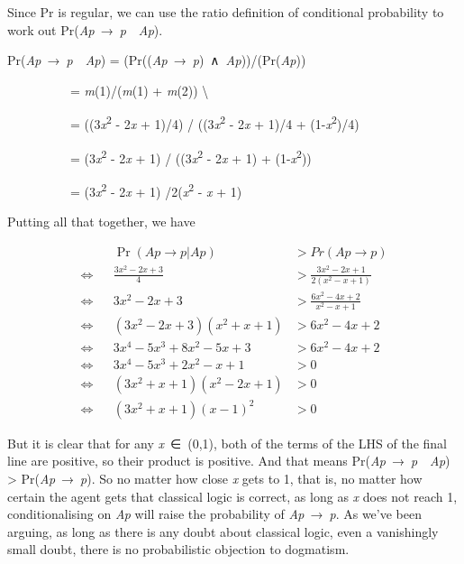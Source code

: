 \documentclass[
  11pt,
  letterpaper,
  DIV=11,
  numbers=noendperiod,
  twoside]{scrartcl}
\begin{document}
Since Pr is regular, we can use the ratio definition of conditional
probability to work out Pr(\emph{Ap}~→~\emph{p}~\textbar~\emph{Ap}).

Pr(\emph{Ap}~→~\emph{p}~\textbar~\emph{Ap}) =
(Pr((\emph{Ap}~→~\emph{p})~∧~\emph{Ap}))/(Pr(\emph{Ap}))\\
\strut ~~~~~~~~~~= \emph{m}(1)/(\emph{m}(1) + \emph{m}(2))
\textbackslash{}\\
\strut ~~~~~~~~~~= ((3\emph{x}\textsuperscript{2} - 2\emph{x} + 1)/4) /
((3\emph{x}\textsuperscript{2} - 2\emph{x} + 1)/4 +
(1-\emph{x}\textsuperscript{2})/4)\\
\strut ~~~~~~~~~~= (3\emph{x}\textsuperscript{2} - 2\emph{x} + 1) /
((3\emph{x}\textsuperscript{2} - 2\emph{x} + 1) +
(1-\emph{x}\textsuperscript{2}))\\
\strut ~~~~~~~~~~= (3\emph{x}\textsuperscript{2} - 2\emph{x} + 1)
/2(\emph{x}\textsuperscript{2} - \emph{x} + 1)

Putting all that together, we have

\[
\begin{aligned}
&& \Pr(Ap \rightarrow p | Ap) &> Pr(Ap \rightarrow p) \\
\Leftrightarrow &&  \frac{3x^2 - 2x + 3}{4}  &> \frac{3x^2 - 2x + 1}{2(x^2 - x + 1)} \\
\Leftrightarrow && 3x^2 - 2x + 3  &> \frac{6x^2 - 4x + 2}{x^2 - x + 1} \\
\Leftrightarrow && (3x^2 - 2x + 3)(x^2 + x + 1)  &> 6x^2 - 4x + 2 \\
\Leftrightarrow && 3x^4 - 5x^3 + 8x^2 - 5x + 3  &> 6x^2 - 4x + 2 \\
\Leftrightarrow && 3x^4 - 5x^3 + 2x^2 - x + 1 &> 0 \\
\Leftrightarrow && (3x^2 + x + 1)(x^2 - 2x + 1) &> 0 \\
\Leftrightarrow && (3x^2 + x + 1)(x - 1)^2 &> 0
\end{aligned}
\]

But it is clear that for any \emph{x}~∈~(0,1), both of the terms of the
LHS of the final line are positive, so their product is positive. And
that means Pr(\emph{Ap}~→~\emph{p}~\textbar~\emph{Ap}) \textgreater{}
Pr(\emph{Ap}~→~\emph{p}). So no matter how close \emph{x} gets to 1,
that is, no matter how certain the agent gets that classical logic is
correct, as long as \emph{x} does not reach 1, conditionalising on
\emph{Ap} will raise the probability of \emph{Ap}~→~\emph{p}. As we've
been arguing, as long as there is any doubt about classical logic, even
a vanishingly small doubt, there is no probabilistic objection to
dogmatism.
\end{document}
